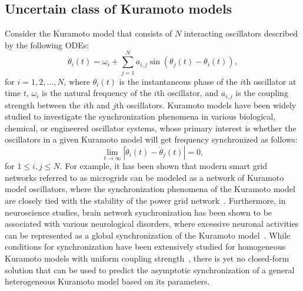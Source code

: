 \documentclass{article}
\begin{document}
\subsection{Uncertain class of Kuramoto models}
Consider the Kuramoto model that consists of $N$ interacting oscillators described by the following ODEs:
\begin{equation}
    \dot{\theta}_i \left( t \right) = \omega_i + \sum^N_{j=1} a_{i, j} \sin \left(\theta_j \left( t \right) - \theta_i \left( t \right) \right),\label{kuramotoModel}
\end{equation}
for ${i = 1, 2,\dots, N}$, where ${\theta_i\left(t\right)}$ is the instantaneous phase of the ${i}$th oscillator at time $t$, ${\omega_i}$ is the natural frequency of the $i$th oscillator, and ${a_{i, j}}$ is the coupling strength between the ${i}$th and ${j}$th oscillators. Kuramoto models have been widely studied to investigate the synchronization phenomena in various biological, chemical, or engineered oscillator systems, whose primary interest is whether the oscillators in a given Kuramoto model will get frequency synchronized as follows:
\begin{equation}
\lim_{t \to \infty} | \dot{\theta}_i \left(t\right) - \dot{\theta}_j \left(t\right) | = 0,\label{criterion}
\end{equation}
for ${1 \le i, j \le N}$. For example, it has been shown that modern smart grid networks referred to as microgrids can be modeled as a network of Kuramoto model oscillators, where the synchronization phenomena of the Kuramoto model are closely tied with the stability of the power grid network~\cite{PRL12,PG13,Auto13,PNAS13}. Furthermore, in neuroscience studies, brain network synchronization has been shown to be associated with various neurological disorders, where excessive neuronal activities can be represented as a global synchronization of the Kuramoto model~\cite{hammond2007pathological,Mohseni2017,Choi2019,lehnertz2009synchronization,PGR2021}. While conditions for synchronization have been extensively studied for homogeneous Kuramoto models with uniform coupling strength~\cite{ARE2008,RODRIGUES20161,ABRS}, there is yet no closed-form solution that can be used to predict the asymptotic synchronization of a general heterogeneous Kuramoto model based on its parameters.
\end{document}
